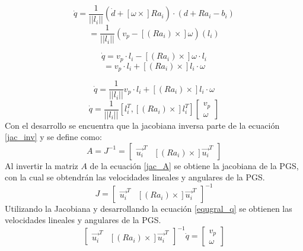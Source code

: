 \begin{equation}
\dot{q}=\frac{1}{||l_i||}(\dot{d} + [\omega \times] Ra_i)\cdot(d + Ra_i -b_i) 
\end{equation}
\begin{equation*}
= \frac{1}{||l_i||}(v_p - [(Ra_i)\times]\omega)(l_i)
\end{equation*}

\begin{equation}
\dot{q} = v_p \cdot l_i - [(Ra_i)\times]\omega \cdot l_i 
\end{equation}
\begin{equation*}
= v_p \cdot l_i + [(Ra_i)\times]l_i \cdot \omega
\end{equation*}

\begin{equation}
\dot{q} = \frac{1}{||l_i||} v_p \cdot l_i + [(Ra_i)\times]l_i \cdot \omega
\end{equation}
\begin{equation} \label{jac_inv}
\dot{q} = \frac{1}{||l_i||} [l_i^T , [(Ra_i)\times]l_i^T] \begin{bmatrix}
v_p\\
\omega
\end{bmatrix}
\end{equation}
Con el desarrollo se encuentra que la jacobiana inversa parte de la ecuación \ref{jac_inv} y se define como:
\begin{equation}\label{jac_A}
A = J^{-1} = \begin{bmatrix}
\vec{u_i}^T & [(Ra_i)\times]\vec{u_i}^T
\end{bmatrix}
\end{equation}
Al invertir la matriz $A$ de la ecuación \ref{jac_A} se obtiene la jacobiana de la PGS, con la cual se obtendrán las velocidades lineales y angulares de la PGS.
\begin{equation*}
J = \begin{bmatrix}
\vec{u_i}^T & [(Ra_i)\times]\vec{u_i}^T
\end{bmatrix}^{-1}
\end{equation*}
Utilizando la Jacobiana y desarrollando la ecuación \ref{equgral_q} se obtienen las velocidades lineales y angulares de la PGS.
\begin{equation*}
\begin{bmatrix}
\vec{u_i}^T & [(Ra_i)\times]\vec{u_i}^T
\end{bmatrix}^{-1} \dot{q} = \begin{bmatrix}
v_p\\
\omega
\end{bmatrix}
\end{equation*}
